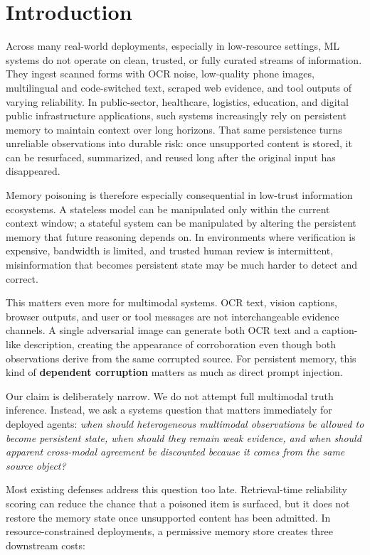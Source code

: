 \documentclass{article}
\begin{document}
\section{Introduction}

Across many real-world deployments, especially in low-resource settings, ML systems do not operate on clean, trusted, or fully curated streams of information. They ingest scanned forms with OCR noise, low-quality phone images, multilingual and code-switched text, scraped web evidence, and tool outputs of varying reliability. In public-sector, healthcare, logistics, education, and digital public infrastructure applications, such systems increasingly rely on persistent memory to maintain context over long horizons. That same persistence turns unreliable observations into durable risk: once unsupported content is stored, it can be resurfaced, summarized, and reused long after the original input has disappeared.

Memory poisoning is therefore especially consequential in low-trust information ecosystems. A stateless model can be manipulated only within the current context window; a stateful system can be manipulated by altering the persistent memory that future reasoning depends on. In environments where verification is expensive, bandwidth is limited, and trusted human review is intermittent, misinformation that becomes persistent state may be much harder to detect and correct.

This matters even more for multimodal systems. OCR text, vision captions, browser outputs, and user or tool messages are not interchangeable evidence channels. A single adversarial image can generate both OCR text and a caption-like description, creating the appearance of corroboration even though both observations derive from the same corrupted source. For persistent memory, this kind of \textbf{dependent corruption} matters as much as direct prompt injection.

Our claim is deliberately narrow. We do not attempt full multimodal truth inference. Instead, we ask a systems question that matters immediately for deployed agents: \emph{when should heterogeneous multimodal observations be allowed to become persistent state, when should they remain weak evidence, and when should apparent cross-modal agreement be discounted because it comes from the same source object?}

Most existing defenses address this question too late. Retrieval-time reliability scoring can reduce the chance that a poisoned item is surfaced, but it does not restore the memory state once unsupported content has been admitted. In resource-constrained deployments, a permissive memory store creates three downstream costs:
\end{document}
